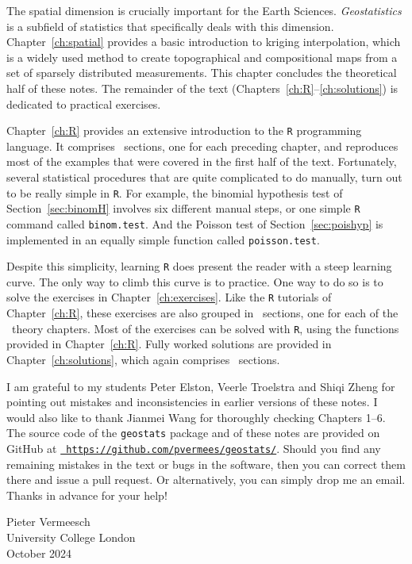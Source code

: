 The spatial dimension is crucially important for the Earth
Sciences. \emph{Geostatistics} is a subfield of statistics that
specifically deals with this dimension. Chapter~\ref{ch:spatial}
provides a basic introduction to kriging interpolation, which is a
widely used method to create topographical and compositional maps from
a set of sparsely distributed measurements. This chapter concludes the
theoretical half of these notes. The remainder of the text
(Chapters~\ref{ch:R}--\ref{ch:solutions}) is dedicated to practical
exercises.\medskip

Chapter~\ref{ch:R} provides an extensive introduction to the
\texttt{R} programming language. It comprises \nch~sections, one for
each preceding chapter, and reproduces most of the examples that were
covered in the first half of the text. Fortunately, several
statistical procedures that are quite complicated to do manually, turn
out to be really simple in \texttt{R}. For example, the binomial
hypothesis test of Section~\ref{sec:binomH} involves six different
manual steps, or one simple \texttt{R} command called
\texttt{binom.test}. And the Poisson test of Section~\ref{sec:poishyp}
is implemented in an equally simple function called
\texttt{poisson.test}.\medskip

Despite this simplicity, learning \texttt{R} does present the reader
with a steep learning curve. The only way to climb this curve is to
practice. One way to do so is to solve the exercises in
Chapter~\ref{ch:exercises}. Like the \texttt{R} tutorials of
Chapter~\ref{ch:R}, these exercises are also grouped in \nch~sections,
one for each of the \nch~theory chapters. Most of the exercises can be
solved with \texttt{R}, using the functions provided in
Chapter~\ref{ch:R}. Fully worked solutions are provided in
Chapter~\ref{ch:solutions}, which again comprises \nch~sections.\medskip

I am grateful to my students Peter Elston, Veerle Troelstra and Shiqi
Zheng for pointing out mistakes and inconsistencies in earlier
versions of these notes. I would also like to thank Jianmei Wang for
thoroughly checking Chapters 1--6. The source code of the
\texttt{geostats} package and of these notes are provided on GitHub at
\href{https://github.com/pvermees/geostats/}{\tt
  https://github.com/pvermees/geostats/}.  Should you find any
remaining mistakes in the text or bugs in the software, then you can
correct them there and issue a pull request. Or alternatively, you can
simply drop me an email. Thanks in advance for your help!\medskip

\begin{flushright}
  Pieter Vermeesch\\ University College London\\ October 2024
\end{flushright}
